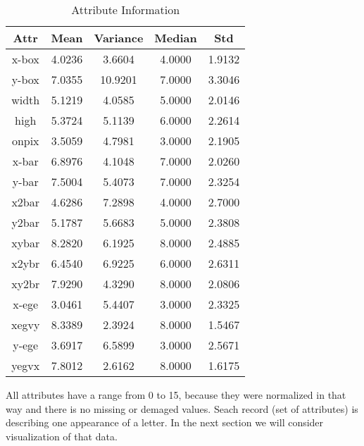 \begin{table}[ht!]
    \centering
    \begin{tabular}{|c|c|c|c|c|}
         \hline
             Attr & Mean & Variance & Median & Std \\ \hline
             x-box & 4.0236 &  3.6604 &  4.0000 &  1.9132 \\ \hline
             y-box & 7.0355 & 10.9201 &  7.0000 &  3.3046 \\ \hline
             width & 5.1219 &  4.0585 &  5.0000 &  2.0146 \\ \hline
             high  & 5.3724 &  5.1139 &  6.0000 &  2.2614 \\ \hline
             onpix & 3.5059 &  4.7981 &  3.0000 &  2.1905 \\ \hline
             x-bar & 6.8976 &  4.1048 &  7.0000 &  2.0260 \\ \hline
             y-bar & 7.5004 &  5.4073 &  7.0000 &  2.3254 \\ \hline
             x2bar & 4.6286 &  7.2898 &  4.0000 &  2.7000 \\ \hline
             y2bar & 5.1787 &  5.6683 &  5.0000 &  2.3808 \\ \hline
             xybar & 8.2820 &  6.1925 &  8.0000 &  2.4885 \\ \hline
             x2ybr & 6.4540 &  6.9225 &  6.0000 &  2.6311 \\ \hline
             xy2br & 7.9290 &  4.3290 &  8.0000 &  2.0806 \\ \hline
             x-ege & 3.0461 &  5.4407 &  3.0000 &  2.3325 \\ \hline
             xegvy & 8.3389 &  2.3924 &  8.0000 &  1.5467 \\ \hline
             y-ege & 3.6917 &  6.5899 &  3.0000 &  2.5671 \\ \hline
             yegvx & 7.8012 &  2.6162 &  8.0000 &  1.6175 \\ \hline
    \end{tabular}
    \caption{Attribute Information}
\end{table}

All attributes have a range from 0 to 15, because they were normalized in that way
and there is no missing or demaged values. Seach record (set of attributes) is
describing one appearance of a letter. In the next section we will consider
visualization of that data.

